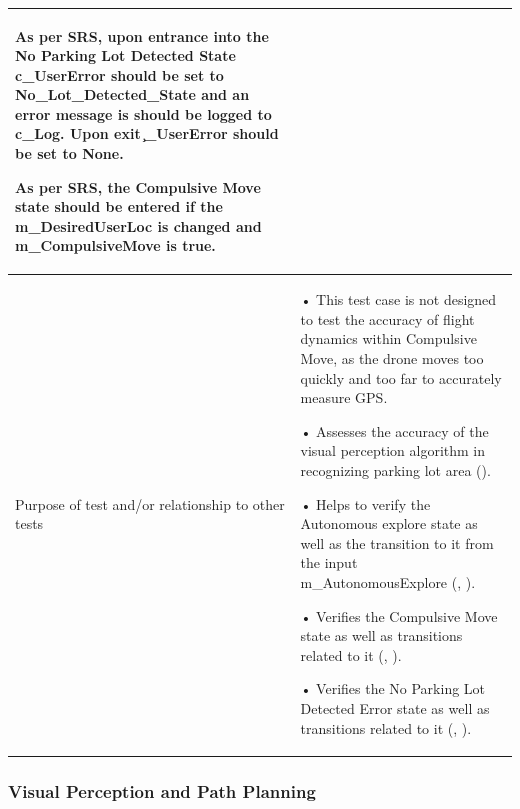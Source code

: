 \documentclass[12pt, titlepage]{article}
\begin{document}
\begin{table}[!h]
\begin{center}
\begin{tabular}{ | m{1.5cm} | m{15cm} | }
As per SRS, upon entrance into the No Parking Lot Detected State c\_UserError should be set to No_Lot_Detected_State and an error message is should be logged to c\_Log. Upon exit \c_UserError should be set to None.

As per SRS, the Compulsive Move state should be entered if the m\_DesiredUserLoc is changed and m\_CompulsiveMove is true. 
 \\ 
\hline
Purpose of test and/or relationship to other tests & 
• This test case is not designed to test the accuracy of flight dynamics within Compulsive Move, as the drone moves too quickly and too far to accurately measure GPS.

• Assesses the accuracy of the visual perception algorithm in recognizing parking lot area (\nameref{GEN_001}).

• Helps to verify the Autonomous explore state as well as the transition to it from the input m\_AutonomousExplore (\nameref{STA_003}, \nameref{TRANS_004}). 

• Verifies the Compulsive Move state as well as transitions related to it (\nameref{STA_011}, \nameref{TRANS_012}).

• Verifies the No Parking Lot Detected Error state as well as transitions related to it (\nameref{STA_008}, \nameref{TRANS_008}).
\\ 
\hline
\end{tabular}
\end{center}
\end{table}

\clearpage

\subsubsection{Visual Perception and Path Planning}
\end{document}
